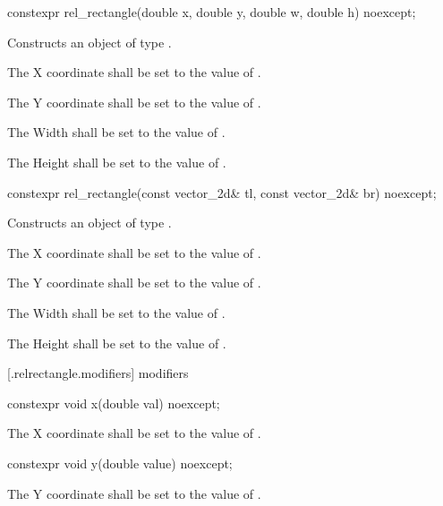 \begin{itemdecl}
constexpr rel_rectangle(double x, double y, double w, double h) noexcept;
\end{itemdecl}
\begin{itemdescr}
\pnum
\effects
Constructs an object of type .

\pnum
The X coordinate shall be set to the value of .

\pnum
The Y coordinate shall be set to the value of .

\pnum
The Width shall be set to the value of .

\pnum
The Height shall be set to the value of .
\end{itemdescr}

\begin{itemdecl}
constexpr rel_rectangle(const vector_2d& tl, const vector_2d& br) noexcept;
\end{itemdecl}
\begin{itemdescr}
\pnum
\effects
Constructs an object of type .

\pnum
The X coordinate shall be set to the value of .

\pnum
The Y coordinate shall be set to the value of .

\pnum
The Width shall be set to the value of .

\pnum
The Height shall be set to the value of .
\end{itemdescr}

 [\iotwod.relrectangle.modifiers]{ modifiers}

\begin{itemdecl}
constexpr void x(double val) noexcept;
\end{itemdecl}

\begin{itemdescr}
\pnum
\effects
The X coordinate shall be set to the value of .
\end{itemdescr}

\begin{itemdecl}
constexpr void y(double value) noexcept;
\end{itemdecl}
\begin{itemdescr}
\pnum
\effects
The Y coordinate shall be set to the value of .
\end{itemdescr}

